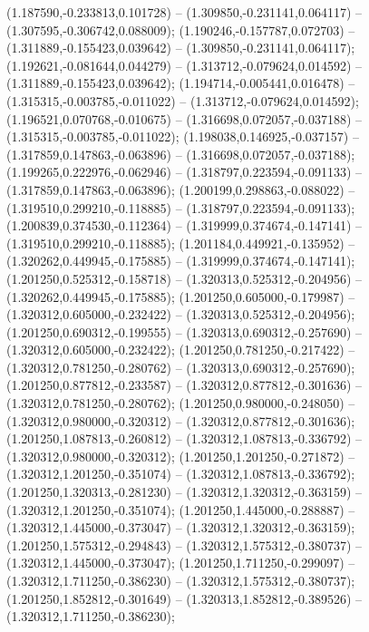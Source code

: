  (1.187590,-0.233813,0.101728) -- (1.309850,-0.231141,0.064117) -- (1.307595,-0.306742,0.088009);
 (1.190246,-0.157787,0.072703) -- (1.311889,-0.155423,0.039642) -- (1.309850,-0.231141,0.064117);
 (1.192621,-0.081644,0.044279) -- (1.313712,-0.079624,0.014592) -- (1.311889,-0.155423,0.039642);
 (1.194714,-0.005441,0.016478) -- (1.315315,-0.003785,-0.011022) -- (1.313712,-0.079624,0.014592);
 (1.196521,0.070768,-0.010675) -- (1.316698,0.072057,-0.037188) -- (1.315315,-0.003785,-0.011022);
 (1.198038,0.146925,-0.037157) -- (1.317859,0.147863,-0.063896) -- (1.316698,0.072057,-0.037188);
 (1.199265,0.222976,-0.062946) -- (1.318797,0.223594,-0.091133) -- (1.317859,0.147863,-0.063896);
 (1.200199,0.298863,-0.088022) -- (1.319510,0.299210,-0.118885) -- (1.318797,0.223594,-0.091133);
 (1.200839,0.374530,-0.112364) -- (1.319999,0.374674,-0.147141) -- (1.319510,0.299210,-0.118885);
 (1.201184,0.449921,-0.135952) -- (1.320262,0.449945,-0.175885) -- (1.319999,0.374674,-0.147141);
 (1.201250,0.525312,-0.158718) -- (1.320313,0.525312,-0.204956) -- (1.320262,0.449945,-0.175885);
 (1.201250,0.605000,-0.179987) -- (1.320312,0.605000,-0.232422) -- (1.320313,0.525312,-0.204956);
 (1.201250,0.690312,-0.199555) -- (1.320313,0.690312,-0.257690) -- (1.320312,0.605000,-0.232422);
 (1.201250,0.781250,-0.217422) -- (1.320312,0.781250,-0.280762) -- (1.320313,0.690312,-0.257690);
 (1.201250,0.877812,-0.233587) -- (1.320312,0.877812,-0.301636) -- (1.320312,0.781250,-0.280762);
 (1.201250,0.980000,-0.248050) -- (1.320312,0.980000,-0.320312) -- (1.320312,0.877812,-0.301636);
 (1.201250,1.087813,-0.260812) -- (1.320312,1.087813,-0.336792) -- (1.320312,0.980000,-0.320312);
 (1.201250,1.201250,-0.271872) -- (1.320312,1.201250,-0.351074) -- (1.320312,1.087813,-0.336792);
 (1.201250,1.320313,-0.281230) -- (1.320312,1.320312,-0.363159) -- (1.320312,1.201250,-0.351074);
 (1.201250,1.445000,-0.288887) -- (1.320312,1.445000,-0.373047) -- (1.320312,1.320312,-0.363159);
 (1.201250,1.575312,-0.294843) -- (1.320312,1.575312,-0.380737) -- (1.320312,1.445000,-0.373047);
 (1.201250,1.711250,-0.299097) -- (1.320312,1.711250,-0.386230) -- (1.320312,1.575312,-0.380737);
 (1.201250,1.852812,-0.301649) -- (1.320313,1.852812,-0.389526) -- (1.320312,1.711250,-0.386230);
